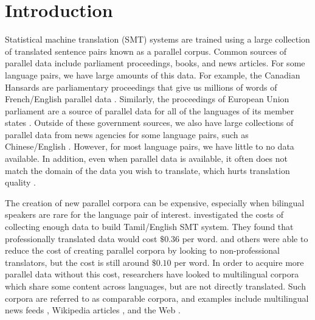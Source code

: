 \chapter{Introduction}
\label{chap:intro}

Statistical machine translation (SMT) systems are trained using a large collection of translated
sentence pairs known as a parallel corpus. Common sources of parallel data include
parliament proceedings, books, and news articles.
For some language pairs, we have large amounts of this data. For example, the Canadian
Hansards are parliamentary proceedings that give us millions of words of
French/English parallel data \citep{Germann01}. Similarly, the proceedings of
European Union parliament are a source of parallel data for all of the languages
of its member states \citep{Koehn05}. Outside of these government sources, we
also have large collections of parallel data from news agencies for some
language pairs, such as Chinese/English \citep{Ma05}.
However, for most language pairs, we have little to no data available.
In addition, even when parallel
data is available, it often does not match the domain of the data you wish to
translate, which hurts translation quality \citep{Munteanu05}.

The creation of new parallel corpora can be expensive, especially when bilingual
speakers are rare for the language pair of interest. \citet{Germann01a}
investigated the costs of collecting enough data to build Tamil/English SMT
system. They found that professionally translated data would cost $\$0.36$ per
word. \citet{Germann01a} and others \citep{Zaidan11} were able to reduce the
cost of creating parallel corpora by looking to non-professional translators,
but the cost is still around $\$0.10$ per word.
In order to acquire more parallel data without this cost,
researchers have looked to multilingual corpora which share some content across languages,
but are not directly translated. Such corpora are referred to as comparable
corpora, and examples include multilingual news feeds \citep{Munteanu05},
Wikipedia articles \citep{Adafre06,Smith10}, and the Web
\citep{Resnik99,Nie99,Chen00}. 

